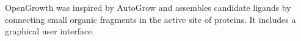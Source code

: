OpenGrowth  \cite{Ch_ron_2015}  was inspired by AutoGrow and assembles candidate ligands by connecting small organic fragments in the active site of proteins.  It includes a graphical user interface.
